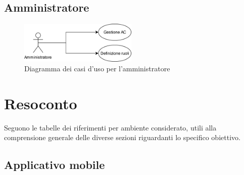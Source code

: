 \documentclass{article}
\begin{document}
\subsection{Amministratore}

\begin{figure}[htbp]
    \centering
    \includegraphics[width=0.5\textwidth]{Images/UseCase_Diagram - Amministratore.png}
    \caption{Diagramma dei casi d'uso per l'amministratore}
\end{figure}
\clearpage

\section{Resoconto}

Seguono le tabelle dei riferimenti per ambiente considerato, utili alla comprensione generale delle diverse sezioni riguardanti lo specifico obiettivo.\\

\subsection{Applicativo mobile}
\end{document}
